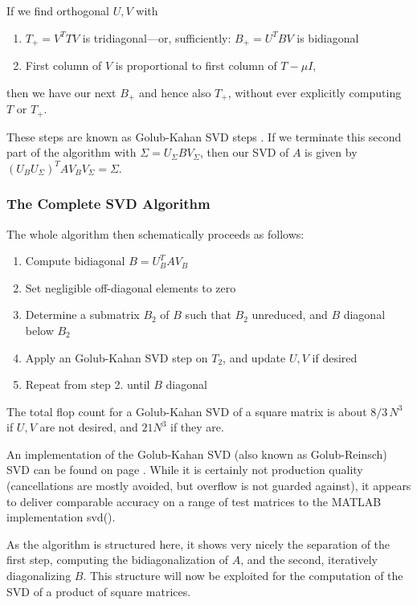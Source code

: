 \documentclass[11pt]{article}
\begin{document}
If we find orthogonal $U, V$ with
\begin{enumerate}
\item $T_+=V^TTV$ is tridiagonal---or, sufficiently: $B_+ = U^TBV$ is bidiagonal
\item First column of $V$ is proportional to first column of $T-\mu I$,
\end{enumerate}
then we have our next $B_+$ and hence also $T_+$, without ever explicitly computing $T$ or $T_+$.

These steps are known as Golub-Kahan SVD steps \cite[section 8.6.2]{GolL96}. If we terminate this second part of the algorithm with $\Sigma=U_\Sigma B V_\Sigma$, then our SVD of $A$ is given by 
$(U_BU_\Sigma)^T A V_B V_\Sigma = \Sigma$.

\subsubsection{The Complete SVD Algorithm}
The whole algorithm then schematically proceeds as follows:
\begin{enumerate}
\item Compute bidiagonal $B = U_B^T A V_B$
\item Set negligible off-diagonal elements to zero
\item Determine a submatrix $B_2$ of $B$ such that $B_2$ unreduced, and $B$ diagonal below $B_2$
\item Apply an Golub-Kahan SVD step on $T_2$, and update $U, V$ if desired
\item Repeat from step 2. until $B$ diagonal 
\end{enumerate}

The total flop count for a Golub-Kahan SVD of a square matrix is about $8/3\, N^3$ if $U, V$ are not desired, and $21 N^3$ if they are.

An implementation of the Golub-Kahan SVD (also known as Golub-Reinsch) SVD can be found on page \pageref{rc:gksvd}. While it is certainly not production quality (cancellations are mostly avoided, but overflow is not guarded against), it appears to deliver comparable accuracy on a range of test matrices to the MATLAB implementation svd(). 

As the algorithm is structured here, it shows very nicely the separation of the first step, computing the bidiagonalization of $A$, and the second, iteratively diagonalizing $B$. This structure will now be exploited for the computation of the SVD of a product of square matrices.
\end{document}
